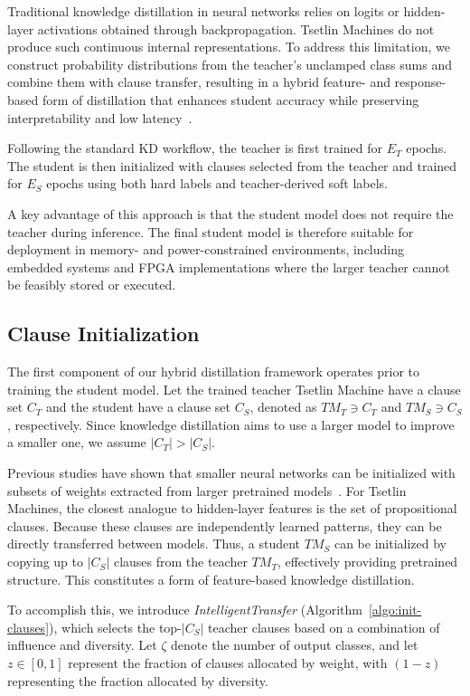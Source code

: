 \documentclass[sn-mathphys-num]{sn-jnl}%
\theoremstyle{thmstyleone}%
\theoremstyle{thmstyletwo}%
\theoremstyle{thmstylethree}%
\begin{document}
Traditional knowledge distillation in neural networks relies on logits or hidden-layer activations obtained through backpropagation. Tsetlin Machines do not produce such continuous internal representations. To address this limitation, we construct probability distributions from the teacher's unclamped class sums and combine them with clause transfer, resulting in a hybrid feature- and response-based form of distillation that enhances student accuracy while preserving interpretability and low latency~\cite{anjum2024novel, xu2023initializingmodelslargerones}. 

Following the standard KD workflow, the teacher is first trained for $E_T$ epochs. The student is then initialized with clauses selected from the teacher and trained for $E_S$ epochs using both hard labels and teacher-derived soft labels.

A key advantage of this approach is that the student model does not require the teacher during inference. The final student model is therefore suitable for deployment in memory- and power-constrained environments, including embedded systems and FPGA implementations where the larger teacher cannot be feasibly stored or executed.

\subsection{Clause Initialization}

The first component of our hybrid distillation framework operates prior to training the student model. Let the trained teacher Tsetlin Machine have a clause set $C_T$ and the student have a clause set $C_S$, denoted as $TM_T \ni C_T$ and $TM_S \ni C_S$, respectively. Since knowledge distillation aims to use a larger model to improve a smaller one, we assume $|C_T| > |C_S|$.

Previous studies have shown that smaller neural networks can be initialized with subsets of weights extracted from larger pretrained models~\cite{xu2023initializingmodelslargerones}. For Tsetlin Machines, the closest analogue to hidden-layer features is the set of propositional clauses. Because these clauses are independently learned patterns, they can be directly transferred between models. Thus, a student $TM_S$ can be initialized by copying up to $|C_S|$ clauses from the teacher $TM_T$, effectively providing pretrained structure. This constitutes a form of feature-based knowledge distillation.

To accomplish this, we introduce \textit{IntelligentTransfer} (Algorithm~\ref{algo:init-clauses}), which selects the top-$|C_S|$ teacher clauses based on a combination of influence and diversity. Let $\zeta$ denote the number of output classes, and let $z \in [0,1]$ represent the fraction of clauses allocated by weight, with $(1-z)$ representing the fraction allocated by diversity.
\end{document}
